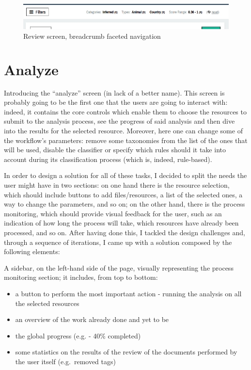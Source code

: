 \documentclass[12pt,svgnames]{memoir}
\begin{document}
\begin{figure}[htbp]
\centering
\includegraphics{./src/img/review-breadcrumb.png}
\caption{Review screen, breadcrumb faceted navigation}
\end{figure}

\section{Analyze}\label{analyze}

Introducing the ``analyze'' screen (in lack of a better name). This
screen is probably going to be the first one that the users are going to
interact with: indeed, it contains the core controls which enable them
to choose the resources to submit to the analysis process, see the
progress of said analysis and then dive into the results for the
selected resource. Moreover, here one can change some of the workflow's
parameters: remove some taxonomies from the list of the ones that will
be used, disable the classifier or specify which rules should it take
into account during its classification process (which is, indeed,
rule-based).

In order to design a solution for all of these tasks, I decided to split
the needs the user might have in two sections: on one hand there is the
resource selection, which should include buttons to add files/resources,
a list of the selected ones, a way to change the parameters, and so on;
on the other hand, there is the process monitoring, which should provide
visual feedback for the user, such as an indication of how long the
process will take, which resources have already been processed, and so
on. After having done this, I tackled the design challenges and, through
a sequence of iterations, I came up with a solution composed by the
following elements:

A sidebar, on the left-hand side of the page, visually representing the
process monitoring section; it includes, from top to bottom:

\begin{itemize}
\itemsep1pt\parskip0pt
\item
  a button to perform the most important action - running the analysis
  on all the selected resources
\item
  an overview of the work already done and yet to be
\item
  the global progress (e.g. - 40\% completed)
\item
  some statistics on the results of the review of the documents
  performed by the user itself (e.g.~removed tags)
\end{itemize}
\end{document}
